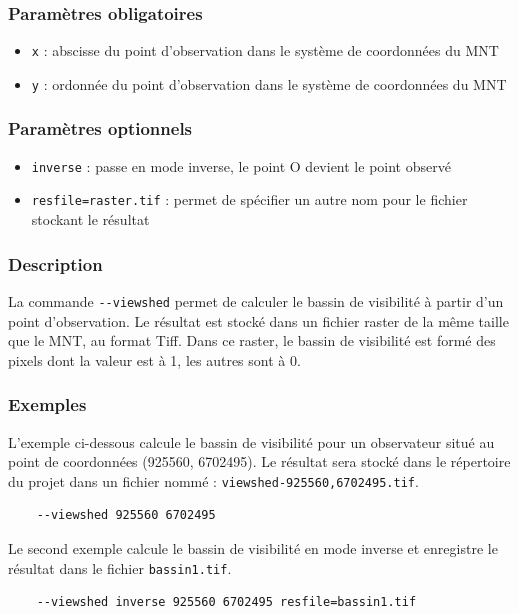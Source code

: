 \documentclass{report}
\begin{document}
\subsubsection{Paramètres obligatoires}
\begin{itemize}
	\item \verb|x| : abscisse du point d'observation dans le système de coordonnées du MNT
	\item \verb|y| : ordonnée du point d'observation dans le système de coordonnées du MNT
\end{itemize}

\subsubsection{Paramètres optionnels}
\begin{itemize}
	\item \verb|inverse| : passe en mode inverse, le point O devient le point observé
	\item \verb|resfile=raster.tif| : permet de spécifier un autre nom pour le fichier stockant le résultat
\end{itemize}

\subsubsection{Description}
La commande \verb|--viewshed| permet de calculer le bassin de visibilité à partir d'un point d'observation. Le résultat est stocké dans un fichier raster de la même taille que le MNT, au format Tiff. Dans ce raster, le bassin de visibilité est formé des pixels dont la valeur est à 1, les autres sont à 0.

\subsubsection{Exemples}
L'exemple ci-dessous calcule le bassin de visibilité pour un observateur situé au point de coordonnées (925560, 6702495). Le résultat sera stocké dans le répertoire du projet dans un fichier nommé : \verb|viewshed-925560,6702495.tif|.
\begin{Verbatim}
	--viewshed 925560 6702495
\end{Verbatim}

Le second exemple calcule le bassin de visibilité en mode inverse et enregistre le résultat dans le fichier \verb|bassin1.tif|.
\begin{Verbatim}
	--viewshed inverse 925560 6702495 resfile=bassin1.tif
\end{Verbatim}
\end{document}
